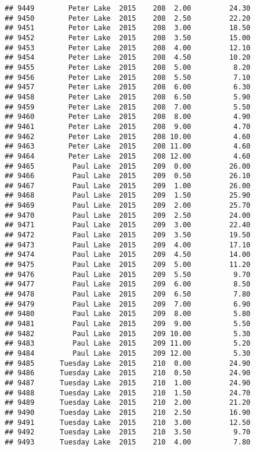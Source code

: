 \documentclass[
]{article}
\begin{document}
\begin{verbatim}
## 9449        Peter Lake  2015    208  2.00         24.30
## 9450        Peter Lake  2015    208  2.50         22.20
## 9451        Peter Lake  2015    208  3.00         18.50
## 9452        Peter Lake  2015    208  3.50         15.00
## 9453        Peter Lake  2015    208  4.00         12.10
## 9454        Peter Lake  2015    208  4.50         10.20
## 9455        Peter Lake  2015    208  5.00          8.20
## 9456        Peter Lake  2015    208  5.50          7.10
## 9457        Peter Lake  2015    208  6.00          6.30
## 9458        Peter Lake  2015    208  6.50          5.90
## 9459        Peter Lake  2015    208  7.00          5.50
## 9460        Peter Lake  2015    208  8.00          4.90
## 9461        Peter Lake  2015    208  9.00          4.70
## 9462        Peter Lake  2015    208 10.00          4.60
## 9463        Peter Lake  2015    208 11.00          4.60
## 9464        Peter Lake  2015    208 12.00          4.60
## 9465         Paul Lake  2015    209  0.00         26.00
## 9466         Paul Lake  2015    209  0.50         26.10
## 9467         Paul Lake  2015    209  1.00         26.00
## 9468         Paul Lake  2015    209  1.50         25.90
## 9469         Paul Lake  2015    209  2.00         25.70
## 9470         Paul Lake  2015    209  2.50         24.00
## 9471         Paul Lake  2015    209  3.00         22.40
## 9472         Paul Lake  2015    209  3.50         19.50
## 9473         Paul Lake  2015    209  4.00         17.10
## 9474         Paul Lake  2015    209  4.50         14.00
## 9475         Paul Lake  2015    209  5.00         11.20
## 9476         Paul Lake  2015    209  5.50          9.70
## 9477         Paul Lake  2015    209  6.00          8.50
## 9478         Paul Lake  2015    209  6.50          7.80
## 9479         Paul Lake  2015    209  7.00          6.90
## 9480         Paul Lake  2015    209  8.00          5.80
## 9481         Paul Lake  2015    209  9.00          5.50
## 9482         Paul Lake  2015    209 10.00          5.30
## 9483         Paul Lake  2015    209 11.00          5.20
## 9484         Paul Lake  2015    209 12.00          5.30
## 9485      Tuesday Lake  2015    210  0.00         24.90
## 9486      Tuesday Lake  2015    210  0.50         24.90
## 9487      Tuesday Lake  2015    210  1.00         24.90
## 9488      Tuesday Lake  2015    210  1.50         24.70
## 9489      Tuesday Lake  2015    210  2.00         21.20
## 9490      Tuesday Lake  2015    210  2.50         16.90
## 9491      Tuesday Lake  2015    210  3.00         12.50
## 9492      Tuesday Lake  2015    210  3.50          9.70
## 9493      Tuesday Lake  2015    210  4.00          7.80

\end{verbatim}
\end{document}
